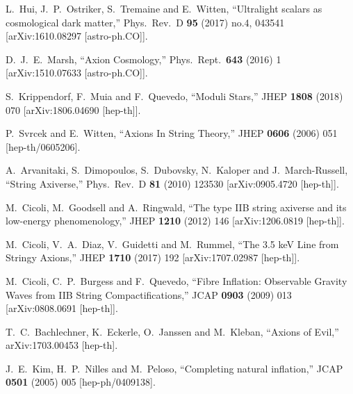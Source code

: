\documentclass[11pt,a4paper]{article}
\begin{document}
\begin{itemize}
\begin{thebibliography}{99}
  L.~Hui, J.~P.~Ostriker, S.~Tremaine and E.~Witten,
  ``Ultralight scalars as cosmological dark matter,''
  Phys.\ Rev.\ D {\bf 95} (2017) no.4,  043541
  [arXiv:1610.08297 [astro-ph.CO]].

  D.~J.~E.~Marsh,
  ``Axion Cosmology,''
  Phys.\ Rept.\  {\bf 643} (2016) 1
  [arXiv:1510.07633 [astro-ph.CO]].

  S.~Krippendorf, F.~Muia and F.~Quevedo,
  ``Moduli Stars,''
  JHEP {\bf 1808} (2018) 070
  [arXiv:1806.04690 [hep-th]].

  P.~Svrcek and E.~Witten,
  ``Axions In String Theory,''
  JHEP {\bf 0606} (2006) 051
  [hep-th/0605206].
  
  A.~Arvanitaki, S.~Dimopoulos, S.~Dubovsky, N.~Kaloper and J.~March-Russell,
  ``String Axiverse,''
  Phys.\ Rev.\ D {\bf 81} (2010) 123530
  [arXiv:0905.4720 [hep-th]].

  M.~Cicoli, M.~Goodsell and A.~Ringwald,
  ``The type IIB string axiverse and its low-energy phenomenology,''
  JHEP {\bf 1210} (2012) 146
  [arXiv:1206.0819 [hep-th]].

  M.~Cicoli, V.~A.~Diaz, V.~Guidetti and M.~Rummel,
  ``The 3.5 keV Line from Stringy Axions,''
  JHEP {\bf 1710} (2017) 192
  [arXiv:1707.02987 [hep-th]].

  M.~Cicoli, C.~P.~Burgess and F.~Quevedo,
  ``Fibre Inflation: Observable Gravity Waves from IIB String Compactifications,''
  JCAP {\bf 0903} (2009) 013
  [arXiv:0808.0691 [hep-th]].

  T.~C.~Bachlechner, K.~Eckerle, O.~Janssen and M.~Kleban,
  ``Axions of Evil,''
  arXiv:1703.00453 [hep-th].

  J.~E.~Kim, H.~P.~Nilles and M.~Peloso,
  ``Completing natural inflation,''
  JCAP {\bf 0501} (2005) 005
  [hep-ph/0409138].
  

\end{thebibliography}
\end{itemize}
\end{document}
